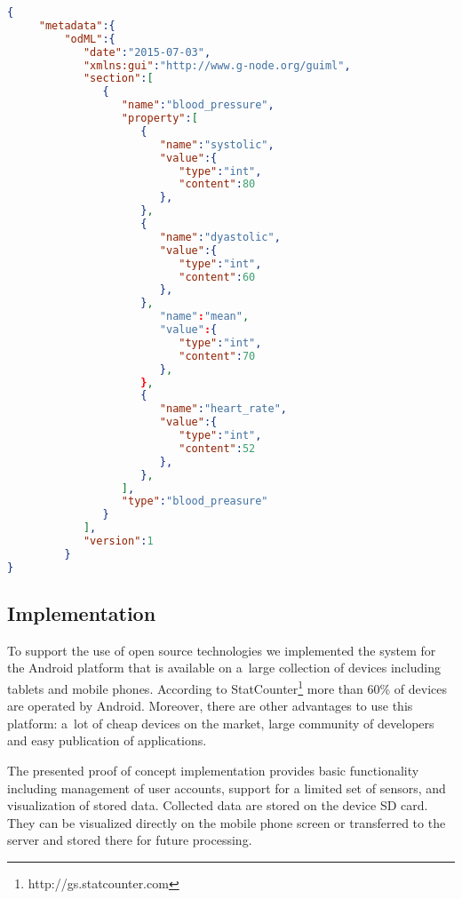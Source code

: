 \documentclass[a4paper,twoside]{article}
\begin{document}
 
\begin{lstlisting}[language=json,caption=blood pressure example, label=odml_example]
{
     "metadata":{
         "odML":{
            "date":"2015-07-03",
            "xmlns:gui":"http://www.g-node.org/guiml",
            "section":[
               {
                  "name":"blood_pressure",
                  "property":[
                     {
                        "name":"systolic",
                        "value":{
                           "type":"int",
                           "content":80
                        },
                     },
                     {
                        "name":"dyastolic",
                        "value":{
                           "type":"int",
                           "content":60
                        },
                     },
                        "name":"mean",
                        "value":{
                           "type":"int",
                           "content":70
                        },
                     },
                     {
                        "name":"heart_rate",
                        "value":{
                           "type":"int",
                           "content":52
                        },
                     },
                  ],
                  "type":"blood_preasure"
               }
            ],
            "version":1
         }
}
\end{lstlisting}

\subsection{Implementation}

To support the use of open source technologies we implemented the system for the Android platform that is available on a~large collection of devices including tablets and mobile phones. According to StatCounter\footnote{http://gs.statcounter.com} more than 60\% of devices are operated by Android. Moreover, there are other advantages to use this platform: a~lot of cheap devices on the market, large community of developers and easy publication of applications.

The presented proof of concept implementation provides basic functionality including management of user accounts, support for a limited set of sensors, and visualization of stored data. Collected data are stored on the device SD card. They can be visualized directly on the mobile phone screen or transferred to the server and stored there for future processing.
\end{document}
